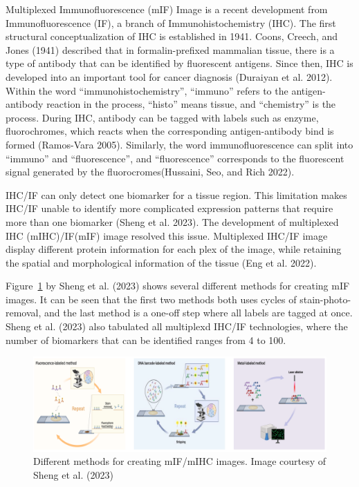 \documentclass[
  letterpaper,
  DIV=11,
  numbers=noendperiod,
  oneside]{scrreprt}
\begin{document}
Multiplexed Immunofluorescence (mIF) Image is a recent development from
Immunofluorescence (IF), a branch of Immunohistochemistry (IHC). The
first structural conceptualization of IHC is established in 1941. Coons,
Creech, and Jones (1941) described that in formalin-prefixed mammalian
tissue, there is a type of antibody that can be identified by
fluorescent antigens. Since then, IHC is developed into an important
tool for cancer diagnosis (Duraiyan et al. 2012). Within the word
``immunohistochemistry'', ``immuno'' refers to the antigen-antibody
reaction in the process, ``histo'' means tissue, and ``chemistry'' is
the process. During IHC, antibody can be tagged with labels such as
enzyme, fluorochromes, which reacts when the corresponding
antigen-antibody bind is formed (Ramos-Vara 2005). Similarly, the word
immunofluorescence can split into ``immuno'' and ``fluorescence'', and
``fluorescence'' corresponds to the fluorescent signal generated by the
fluorocromes(Hussaini, Seo, and Rich 2022).

IHC/IF can only detect one biomarker for a tissue region. This
limitation makes IHC/IF unable to identify more complicated expression
patterns that require more than one biomarker (Sheng et al. 2023). The
development of multiplexed IHC (mIHC)/IF(mIF) image resolved this issue.
Multiplexed IHC/IF image display different protein information for each
plex of the image, while retaining the spatial and morphological
information of the tissue (Eng et al. 2022).

Figure~\ref{fig-1} by Sheng et al. (2023) shows several different
methods for creating mIF images. It can be seen that the first two
methods both uses cycles of stain-photo-removal, and the last method is
a one-off step where all labels are tagged at once. Sheng et al. (2023)
also tabulated all multiplexd IHC/IF technologies, where the number of
biomarkers that can be identified ranges from 4 to 100.

\begin{figure}

{\centering \includegraphics{mIFsteps.png}

}

\caption{\label{fig-1}Different methods for creating mIF/mIHC images.
Image courtesy of Sheng et al. (2023)}

\end{figure}
\end{document}
